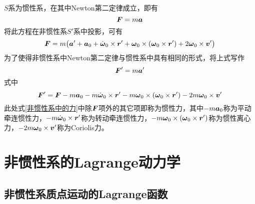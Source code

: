 $S$系为惯性系，在其中Newton第二定律成立，即有
\begin{equation*}
	\boldsymbol{F} = m \boldsymbol{a}
\end{equation*}
将此方程在非惯性系$S'$系中投影，可有
\begin{equation*}
	\boldsymbol{F} = m \big(\boldsymbol{a}' + \boldsymbol{a}_0 + \dot{\boldsymbol{\omega}}_0 \times \boldsymbol{r}' + \boldsymbol{\omega}_0 \times (\boldsymbol{\omega}_0 \times \boldsymbol{r}') + 2\boldsymbol{\omega}_0 \times \boldsymbol{v}'\big)
\end{equation*}
为了使得非惯性系中Newton第二定律与惯性系中具有相同的形式，将上式写作
\begin{equation}
	\boldsymbol{F}' = m \boldsymbol{a}'
\end{equation}
式中
\begin{equation}
	\boldsymbol{F}' = \boldsymbol{F} - m\boldsymbol{a}_0 - m\dot{\boldsymbol{\omega}}_0 \times \boldsymbol{r}' - m\boldsymbol{\omega}_0 \times (\boldsymbol{\omega}_0 \times \boldsymbol{r}') - 2m\boldsymbol{\omega}_0 \times \boldsymbol{v}'
	\label{非惯性系中的力}
\end{equation}
此处式\eqref{非惯性系中的力}中除$\boldsymbol{F}$项外的其它项即称为{\heiti 惯性力}，其中$-m\boldsymbol{a}_0$称为{\heiti 平动牵连惯性力}，$-m\dot{\boldsymbol{\omega}}_0 \times \boldsymbol{r}'$称为{\heiti 转动牵连惯性力}，$-m\boldsymbol{\omega}_0 \times (\boldsymbol{\omega}_0 \times \boldsymbol{r}')$称为{\heiti 惯性离心力}，$-2m\boldsymbol{\omega}_0 \times \boldsymbol{v}'$称为{\heiti Coriolis力}。

\section{非惯性系的Lagrange动力学}

\subsection{非惯性系质点运动的Lagrange函数}

